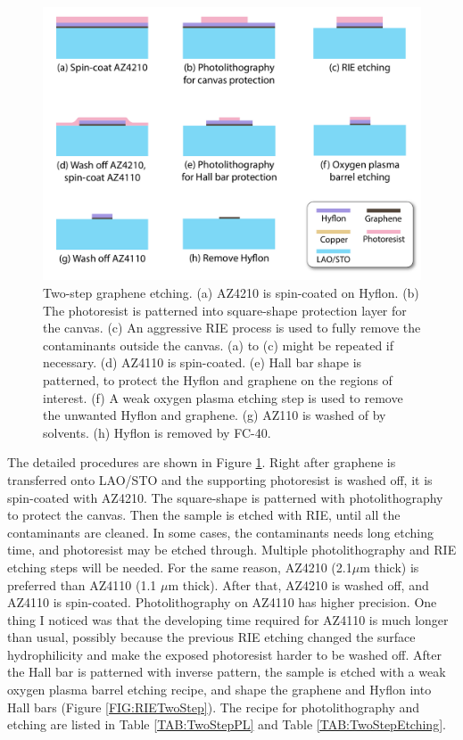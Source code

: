 \documentclass[pdflatex, sectionletters, 12pt]{pittetd}    %
\begin{document}
\begin{figure}[p]
	\centering
	\includegraphics[width=.8\textwidth]{Drawing/TwoStepEtching.pdf}
	\caption{Two-step graphene etching. (a) AZ4210 is spin-coated on Hyflon. (b) The photoresist is patterned into square-shape protection layer for the canvas. (c) An aggressive RIE process is used to fully remove the contaminants outside the canvas. (a) to (c) might be repeated if necessary. (d) AZ4110 is spin-coated. (e) Hall bar shape is patterned, to protect the Hyflon and graphene on the regions of interest. (f) A weak oxygen plasma etching step is used to remove the unwanted Hyflon and graphene. (g) AZ110 is washed of by solvents. (h) Hyflon is removed by FC-40.}
	\label{FIG:TwoStepEtching}
\end{figure}

The detailed procedures are shown in Figure \ref{FIG:TwoStepEtching}. Right after graphene is transferred onto LAO/STO and the supporting photoresist is washed off, it is spin-coated with AZ4210. The square-shape is patterned with photolithography to protect the canvas. Then the sample is etched with RIE, until all the contaminants are cleaned. In some cases, the contaminants needs long etching time, and photoresist may be etched through. Multiple photolithography and RIE etching steps will be needed. For the same reason, AZ4210 (2.1$\mu$m thick) is preferred than AZ4110 (1.1 $\mu$m thick). After that, AZ4210 is washed off, and AZ4110 is spin-coated. Photolithography on AZ4110 has higher precision. One thing I noticed was that the developing time required for AZ4110 is much longer than usual, possibly because the previous RIE etching changed the surface hydrophilicity and make the exposed photoresist harder to be washed off. After the Hall bar is patterned with inverse pattern, the sample is etched with a weak oxygen plasma barrel etching recipe, and shape the graphene and Hyflon into Hall bars (Figure \ref{FIG:RIETwoStep}). The recipe for photolithography and etching are listed in Table \ref{TAB:TwoStepPL} and Table \ref{TAB:TwoStepEtching}.
\end{document}

